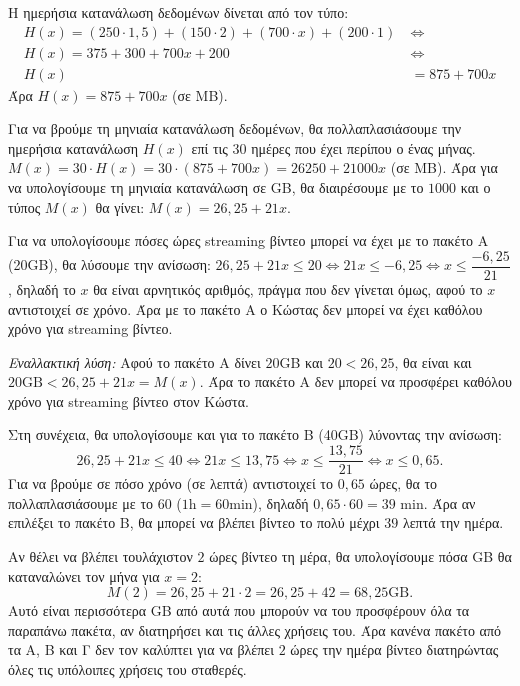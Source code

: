 
\begin{alist}
\item Η ημερήσια κατανάλωση δεδομένων δίνεται από τον τύπο:
\begin{align*}
H(x) = (250 \cdot 1,5) + (150 \cdot 2) + (700 \cdot x) + (200 \cdot 1) \ &\Leftrightarrow \\
H(x) = 375 + 300 + 700x + 200 \ &\Leftrightarrow \\
H(x) &= 875 + 700x
\end{align*}
Άρα $H(x) = 875 + 700x$ (σε MB).

\item Για να βρούμε τη μηνιαία κατανάλωση δεδομένων, θα πολλαπλασιάσουμε την ημερήσια κατανάλωση $H(x)$ επί τις $30$ ημέρες που έχει περίπου ο ένας μήνας.
$M(x) = 30 \cdot H(x) = 30 \cdot (875 + 700x) = 26250 + 21000x$ (σε MB).
Άρα για να υπολογίσουμε τη μηνιαία κατανάλωση σε GB, θα διαιρέσουμε με το $1000$ και ο τύπος $M(x)$ θα γίνει:
$M(x) = 26,25 + 21x$.

\item Για να υπολογίσουμε πόσες ώρες streaming βίντεο μπορεί να έχει με το πακέτο Α (20GB), θα λύσουμε την ανίσωση:
$26,25 + 21x \le 20 \Leftrightarrow 21x \le -6,25 \Leftrightarrow x \le \dfrac{-6,25}{21}$, δηλαδή το $x$ θα είναι αρνητικός αριθμός, πράγμα που δεν γίνεται όμως, αφού το $x$ αντιστοιχεί σε χρόνο. Άρα με το πακέτο Α ο Κώστας δεν μπορεί να έχει καθόλου χρόνο για streaming βίντεο.

\textit{Εναλλακτική λύση:}
Αφού το πακέτο Α δίνει $20$GB και $20 < 26,25$, θα είναι και $20\text{GB} < 26,25 + 21x = M(x)$.
Άρα το πακέτο Α δεν μπορεί να προσφέρει καθόλου χρόνο για streaming βίντεο στον Κώστα.

Στη συνέχεια, θα υπολογίσουμε και για το πακέτο Β (40GB) λύνοντας την ανίσωση:
\[26,25 + 21x \le 40 \Leftrightarrow 21x \le 13,75 \Leftrightarrow x \le \dfrac{13,75}{21} \Leftrightarrow x \le 0,65.\]
Για να βρούμε σε πόσο χρόνο (σε λεπτά) αντιστοιχεί το $0,65$ ώρες, θα το πολλαπλασιάσουμε με το $60$ ($1\text{h} = 60\text{min}$), δηλαδή $0,65 \cdot 60 = 39 \text{ min}$.
Άρα αν επιλέξει το πακέτο Β, θα μπορεί να βλέπει βίντεο το πολύ μέχρι $39$ λεπτά την ημέρα.

\item Αν θέλει να βλέπει τουλάχιστον $2$ ώρες βίντεο τη μέρα, θα υπολογίσουμε πόσα GB θα καταναλώνει τον μήνα για $x = 2$:
\[M(2) = 26,25 + 21 \cdot 2 = 26,25 + 42 = 68,25\text{GB}.\]
Αυτό είναι περισσότερα GB από αυτά που μπορούν να του προσφέρουν όλα τα παραπάνω πακέτα, αν διατηρήσει και τις άλλες χρήσεις του. Άρα κανένα πακέτο από τα Α, Β και Γ δεν τον καλύπτει για να βλέπει $2$ ώρες την ημέρα βίντεο διατηρώντας όλες τις υπόλοιπες χρήσεις του σταθερές.


\end{alist}
